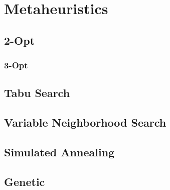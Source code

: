\chapter{Metaheuristics}

\section{2-Opt}

\subsection{3-Opt}

\section{Tabu Search}

\section{Variable Neighborhood Search}

\section{Simulated Annealing}

\section{Genetic}